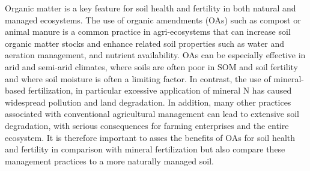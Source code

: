 Organic matter is a key feature for soil health and fertility in both natural and managed ecosystems. The use of organic amendments (OAs) such as compost or animal manure is a common practice in agri-ecosystems that can increase soil organic matter stocks and enhance related soil properties such as  water and aeration management, and nutrient availability. OAs can be especially effective in arid and semi-arid climates, where soils are often poor in SOM and soil fertility and where soil moisture is often a limiting factor. In contrast, the use of mineral-based fertilization, in particular excessive application of mineral N has caused widespread pollution and land degradation. In addition, many other practices associated with conventional agricultural management can lead to extensive soil degradation, with serious consequences for farming enterprises and the entire ecosystem. It is therefore important to asses the benefits of OAs for soil health and fertility in comparison with mineral fertilization but also compare these management practices to a more naturally managed soil. 